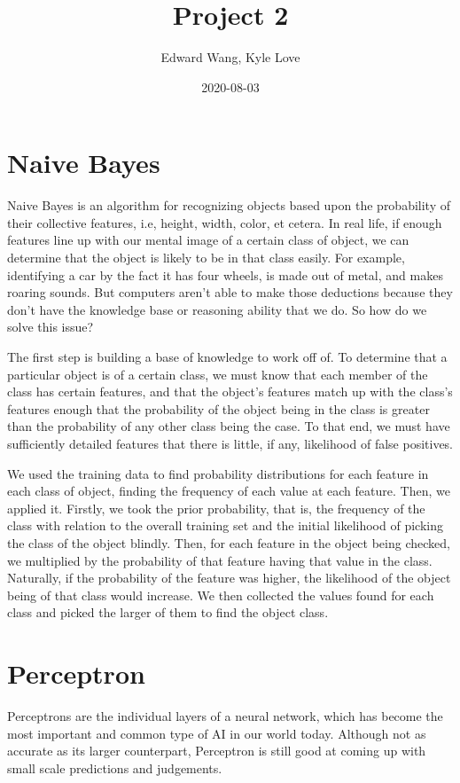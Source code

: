 \documentclass{article}
\title{Project 2}
\date{2020-08-03}
\author{Edward Wang, Kyle Love}
\begin{document}
\maketitle

\section{Naive Bayes}
Naive Bayes is an algorithm for recognizing objects based upon the probability of their collective features, i.e, height, width, color, et cetera. In real life, if enough features line up with our mental image of a certain class of object, we can determine that the object is likely to be in that class easily. For example, identifying a car by the fact it has four wheels, is made out of metal, and makes roaring sounds. But computers aren't able to make those deductions because they don't have the knowledge base or reasoning ability that we do. So how do we solve this issue?
\par
The first step is building a base of knowledge to work off of. To determine that a particular object is of a certain class, we must know that each member of the class has certain features, and that the object's features match up with the class's features enough that the probability of the object being in the class is greater than the probability of any other class being the case. To that end, we must have sufficiently detailed features that there is little, if any, likelihood of false positives.
\par
We used the training data to find probability distributions for each feature in each class of object, finding the frequency of each value at each feature. Then, we applied it. Firstly, we took the prior probability, that is, the frequency of the class with relation to the overall training set and the initial likelihood of picking the class of the object blindly. Then, for each feature in the object being checked, we multiplied by the probability of that feature having that value in the class. Naturally, if the probability of the feature was higher, the likelihood of the object being of that class would increase. We then collected the values found for each class and picked the larger of them to find the object class.
\section{Perceptron}
Perceptrons are the individual layers of a neural network, which has become the most important and common type of AI in our world today. Although not as accurate as its larger counterpart, Perceptron is still good at coming up with small scale predictions and judgements.
\end{document}
